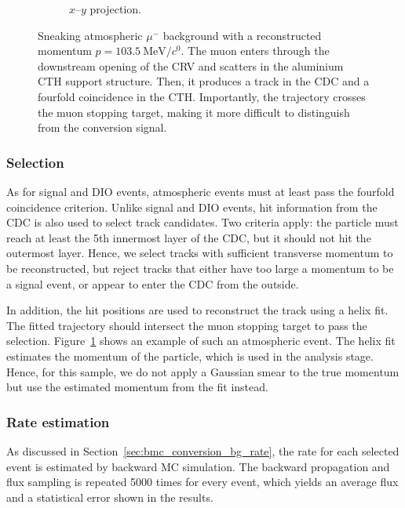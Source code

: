 \begin{figure}
\begin{subfigure}{0.43\textwidth}
        \caption{$x$--$y$ projection.}
    \end{subfigure}
    \caption[Sneaking atmospheric $\mu^-$ background]{ Sneaking atmospheric
        $\mu^-$ background with a reconstructed momentum
        $p=\SI{103.5}{\MeV/\clight}$. The muon enters through the downstream
        opening of the CRV and scatters in the aluminium CTH support structure.
        Then, it produces a track in the CDC and a fourfold coincidence in the
        CTH. Importantly, the trajectory crosses the muon stopping target,
        making it more difficult to distinguish from the conversion signal. }
    \label{fig:cosmic_muon_bg_in_cydet}
\end{figure}

\subsubsection{Selection}
As for signal and DIO events, atmospheric events must at least pass the fourfold
coincidence criterion. Unlike signal and DIO events, hit information from the
CDC is also used to select track candidates. Two criteria apply: the particle
must reach at least the 5th innermost layer of the CDC, but it should not hit
the outermost layer. Hence, we select tracks with sufficient transverse
momentum to be reconstructed, but reject tracks that either have too large a
momentum to be a signal event, or appear to enter the CDC from the outside. 

In addition, the hit positions are used to reconstruct the track using a helix
fit. The fitted trajectory should intersect the muon stopping target to pass the
selection. Figure~\ref{fig:cosmic_muon_bg_in_cydet} shows an example of such an
atmospheric event. The helix fit estimates the momentum of the particle, which
is used in the analysis stage. Hence, for this sample, we do not apply a
Gaussian smear to the true momentum but use the estimated momentum from the fit
instead.

\subsubsection{Rate estimation}
As discussed in Section~\ref{sec:bmc_conversion_bg_rate}, the rate for each selected
event is estimated by backward MC simulation. The backward propagation and flux
sampling is repeated 5000 times for every event, which yields an average flux
and a statistical error shown in the results.


